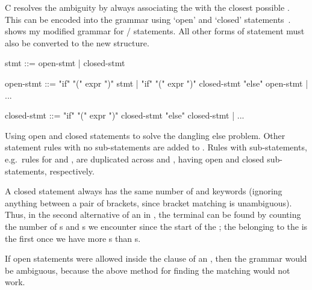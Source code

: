 \documentclass[00-main.tex]{subfiles}
\begin{document}
C resolves the ambiguity by always associating the  with the closest possible .
This can be encoded into the grammar using `open' and `closed' statements~.
 shows my modified grammar for / statements.
All other forms of statement must also be converted to the new structure.


\begin{listing}[t]
  \begin{GrammarListing}
    stmt        ::= open-stmt | closed-stmt

    open-stmt   ::= "if" "(" expr ")" stmt
                  | "if" "(" expr ")" closed-stmt "else" open-stmt
                  | ...

    closed-stmt ::= "if" "(" expr ")" closed-stmt "else" closed-stmt
                  | ...
  \end{GrammarListing}
  \caption{Using open and closed statements to solve the dangling else problem. Other statement rules with no sub-statements are added to . Rules with sub-statements, e.g.~rules for  and , are duplicated across  and , having open and closed sub-statements, respectively.\medskip}
  \label{lst:open/closed statement grammar}
\end{listing}

A closed statement always has the same number of  and  keywords (ignoring anything between a pair of brackets, since bracket matching is unambiguous).
Thus, in the second alternative of an  in , the  terminal can be found by counting the number of s and s we encounter since the start of the ; the  belonging to the  is the first  once we have more s than s.

If open statements were allowed inside the  clause of an , then the grammar would be ambiguous, because the above method for finding the matching  would not work.
\end{document}
